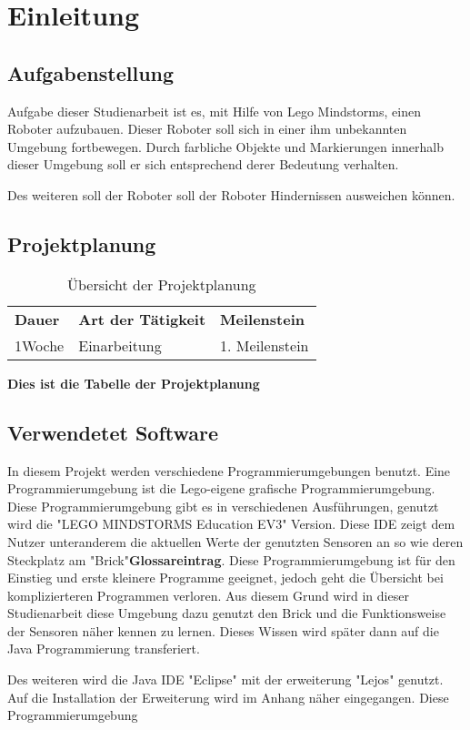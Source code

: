 \chapter{Einleitung}
\section{Aufgabenstellung}
Aufgabe dieser Studienarbeit ist es, mit Hilfe von Lego Mindstorms, einen Roboter aufzubauen. Dieser Roboter soll sich in einer ihm unbekannten Umgebung fortbewegen. Durch farbliche Objekte und Markierungen innerhalb dieser Umgebung soll er sich entsprechend derer Bedeutung verhalten. 

Des weiteren soll der Roboter soll der Roboter Hindernissen ausweichen können. 

\section{Projektplanung}
\begin{table}[htp]
\centering
\begin{tabularx}{\textwidth}{|X|X|X|}
\cline{1-3}
  \textbf{ Dauer}&\textbf{Art der Tätigkeit}&\textbf{Meilenstein} \\\cline{1-3}
  1Woche& Einarbeitung & 1. Meilenstein\\\cline{1-3}
\end{tabularx}
\caption{Übersicht der Projektplanung}
\label{tab:projektplaung}
\end{table}
\textbf{Dies ist die Tabelle der Projektplanung}

\section{Verwendetet Software}
In diesem Projekt werden verschiedene Programmierumgebungen benutzt. Eine Programmierumgebung ist die Lego-eigene grafische Programmierumgebung. Diese Programmierumgebung gibt es in verschiedenen Ausführungen, genutzt wird die "LEGO MINDSTORMS Education EV3" Version. Diese IDE zeigt dem Nutzer unteranderem die aktuellen Werte der genutzten Sensoren an so wie deren Steckplatz am "Brick"\textbf{Glossareintrag}. Diese Programmierumgebung ist für den Einstieg und erste kleinere Programme geeignet, jedoch geht die Übersicht bei komplizierteren Programmen verloren. Aus diesem Grund wird in dieser Studienarbeit diese Umgebung dazu genutzt den Brick und die Funktionsweise der Sensoren näher kennen zu lernen. Dieses Wissen wird später dann auf die Java Programmierung transferiert.

Des weiteren wird die Java IDE "Eclipse" mit der erweiterung "Lejos" genutzt. Auf die Installation der Erweiterung wird im Anhang näher eingegangen. Diese Programmierumgebung 








